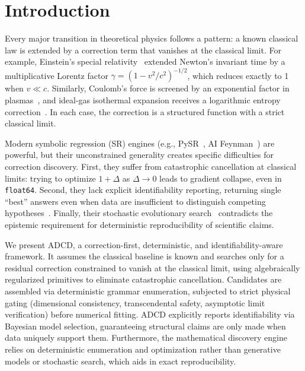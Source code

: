 ﻿\documentclass{article}
\begin{document}
\section{Introduction}

Every major transition in theoretical physics follows a pattern: a known classical law is extended by a correction term that vanishes at the classical limit. For example, Einstein's special relativity~\cite{einstein1905} extended Newton's invariant time by a multiplicative Lorentz factor $\gamma = (1 - v^2/c^2)^{-1/2}$, which reduces exactly to 1 when $v \ll c$. Similarly, Coulomb's force is screened by an exponential factor in plasmas~\cite{debye1923}, and ideal-gas isothermal expansion receives a logarithmic entropy correction~\cite{callen1985}. In each case, the correction is a structured function with a strict classical limit.

Modern symbolic regression (SR) engines (e.g., PySR~\cite{cranmer2023}, AI Feynman~\cite{udrescu2020}) are powerful, but their unconstrained generality creates specific difficulties for correction discovery. First, they suffer from catastrophic cancellation at classical limits: trying to optimize $1 + \Delta$ as $\Delta \to 0$ leads to gradient collapse, even in \texttt{float64}. Second, they lack explicit identifiability reporting, returning single ``best'' answers even when data are insufficient to distinguish competing hypotheses~\cite{lacava2021}. Finally, their stochastic evolutionary search~\cite{bongard2007} contradicts the epistemic requirement for deterministic reproducibility of scientific claims. 

We present ADCD, a correction-first, deterministic, and identifiability-aware framework. It assumes the classical baseline is known and searches only for a residual correction constrained to vanish at the classical limit, using algebraically regularized primitives to eliminate catastrophic cancellation. Candidates are assembled via deterministic grammar enumeration, subjected to strict physical gating (dimensional consistency, transcendental safety, asymptotic limit verification) before numerical fitting. ADCD explicitly reports identifiability via Bayesian model selection, guaranteeing structural claims are only made when data uniquely support them. Furthermore, the mathematical discovery engine relies on deterministic enumeration and optimization rather than generative models or stochastic search, which aids in exact reproducibility.
\end{document}

